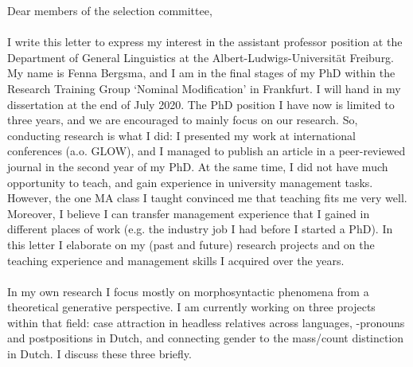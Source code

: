 \documentclass[12pt]{article}
\begin{document}
\raggedright

Dear members of the selection committee,\\

\phantom{x}\\

I write this letter to express my interest in the assistant professor position at the Department of General Linguistics at the Albert-Ludwigs-Universität Freiburg. My name is Fenna Bergsma, and I am in the final stages of my PhD within the Research Training Group `Nominal Modification' in Frankfurt. I will hand in my dissertation at the end of July 2020. The PhD position I have now is limited to three years, and we are encouraged to mainly focus on our research. So, conducting research is what I did: I presented my work at international conferences (a.o. GLOW), and I managed to publish an article in a peer-reviewed journal in the second year of my PhD. At the same time, I did not have much opportunity to teach, and gain experience in university management tasks. However, the one MA class I taught convinced me that teaching fits me very well. Moreover, I believe I can transfer management experience that I gained in different places of work (e.g. the industry job I had before I started a PhD). In this letter I elaborate on my (past and future) research projects and on the teaching experience and management skills I acquired over the years.\\

\phantom{x}\\

In my own research I focus mostly on morphosyntactic phenomena from a theoretical generative perspective. I am currently working on three projects within that field: case attraction in headless relatives across languages, -pronouns and postpositions in Dutch, and connecting gender to the mass/count distinction in Dutch. I discuss these three briefly.\\

\phantom{x}\\
\end{document}
